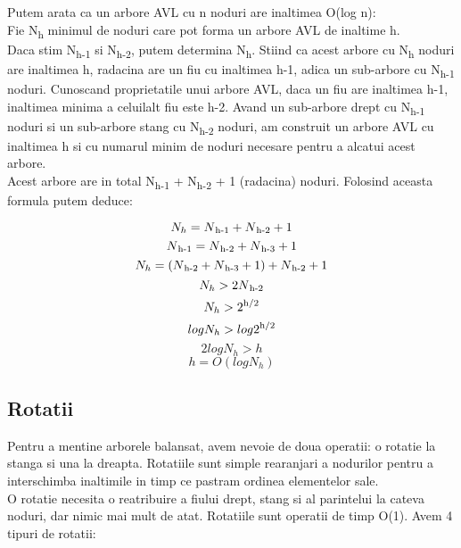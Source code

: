 \documentclass[12pt]{article}
\begin{document}
Putem arata ca un arbore AVL cu n noduri are inaltimea O(log n):\\
Fie N\textsubscript{h} minimul de noduri care pot forma un arbore AVL de inaltime h.\\
Daca stim N\textsubscript{h-1} si  N\textsubscript{h-2}, putem determina  N\textsubscript{h}. Stiind ca acest arbore cu N\textsubscript{h} noduri are inaltimea h, radacina are un fiu cu inaltimea h-1, adica
un sub-arbore cu N\textsubscript{h-1} noduri. Cunoscand proprietatile unui arbore AVL, daca un fiu are
inaltimea h-1, inaltimea minima a celuilalt fiu este h-2. Avand un sub-arbore drept cu N\textsubscript{h-1}
noduri si un sub-arbore stang cu N\textsubscript{h-2} noduri, am construit un arbore AVL cu inaltimea h
si cu numarul minim de noduri necesare pentru a alcatui acest arbore.
\\Acest arbore are in total N\textsubscript{h-1} + N\textsubscript{h-2} + 1 (radacina) noduri. Folosind aceasta formula
putem deduce:


\[ N_h = N\textsubscript{h-1} + N\textsubscript{h-2} + 1 \]
\[ N\textsubscript{h-1} = N\textsubscript{h-2} + N\textsubscript{h-3} + 1 \]
\[ N_h = ( N\textsubscript{h-2} + N\textsubscript{h-3} + 1 ) + N\textsubscript{h-2} + 1  \]
\[ N_h > 2N\textsubscript{h-2}\]
\[ N_h > 2\textsuperscript{h/2}\]
\[ log N_h > log 2\textsuperscript{h/2}\]
\[ 2log N_h > h\]
\[h = O(log N_h)\]

\subsection{Rotatii}

Pentru a mentine arborele balansat, avem nevoie de doua operatii: o rotatie la stanga si una la dreapta.
Rotatiile sunt simple rearanjari a nodurilor pentru a interschimba inaltimile in timp ce pastram
ordinea elementelor sale. \\O rotatie necesita o reatribuire a fiului drept, stang si al parintelui la cateva 
noduri, dar nimic mai mult de atat. Rotatiile sunt operatii de timp O(1).
Avem 4 tipuri de rotatii:
\end{document}
